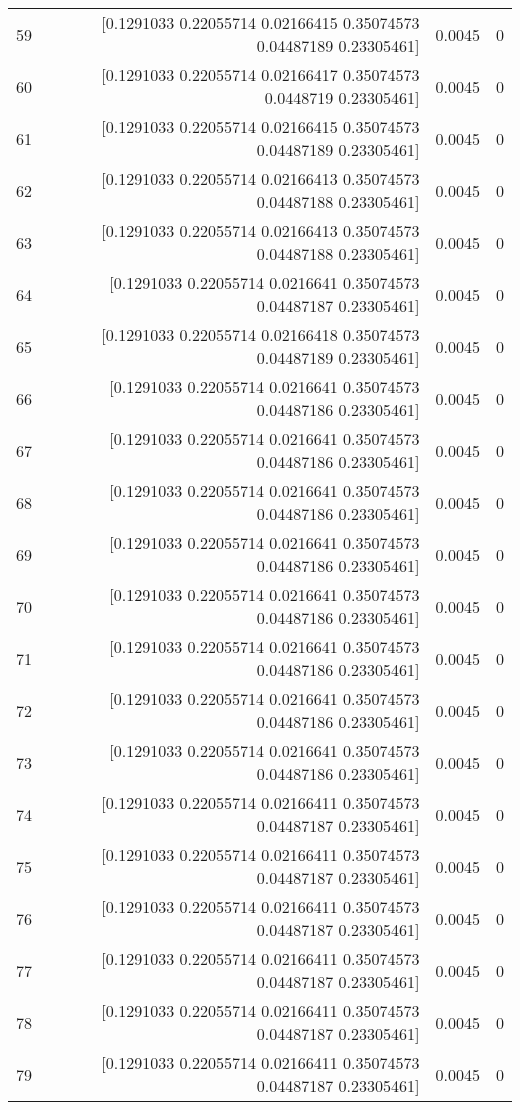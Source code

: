 \begin{longtable}{lrrr}
59 & [0.1291033  0.22055714 0.02166415 0.35074573 0.04487189 0.23305461] & 0.0045 & 0 \\
60 & [0.1291033  0.22055714 0.02166417 0.35074573 0.0448719  0.23305461] & 0.0045 & 0 \\
61 & [0.1291033  0.22055714 0.02166415 0.35074573 0.04487189 0.23305461] & 0.0045 & 0 \\
62 & [0.1291033  0.22055714 0.02166413 0.35074573 0.04487188 0.23305461] & 0.0045 & 0 \\
63 & [0.1291033  0.22055714 0.02166413 0.35074573 0.04487188 0.23305461] & 0.0045 & 0 \\
64 & [0.1291033  0.22055714 0.0216641  0.35074573 0.04487187 0.23305461] & 0.0045 & 0 \\
65 & [0.1291033  0.22055714 0.02166418 0.35074573 0.04487189 0.23305461] & 0.0045 & 0 \\
66 & [0.1291033  0.22055714 0.0216641  0.35074573 0.04487186 0.23305461] & 0.0045 & 0 \\
67 & [0.1291033  0.22055714 0.0216641  0.35074573 0.04487186 0.23305461] & 0.0045 & 0 \\
68 & [0.1291033  0.22055714 0.0216641  0.35074573 0.04487186 0.23305461] & 0.0045 & 0 \\
69 & [0.1291033  0.22055714 0.0216641  0.35074573 0.04487186 0.23305461] & 0.0045 & 0 \\
70 & [0.1291033  0.22055714 0.0216641  0.35074573 0.04487186 0.23305461] & 0.0045 & 0 \\
71 & [0.1291033  0.22055714 0.0216641  0.35074573 0.04487186 0.23305461] & 0.0045 & 0 \\
72 & [0.1291033  0.22055714 0.0216641  0.35074573 0.04487186 0.23305461] & 0.0045 & 0 \\
73 & [0.1291033  0.22055714 0.0216641  0.35074573 0.04487186 0.23305461] & 0.0045 & 0 \\
74 & [0.1291033  0.22055714 0.02166411 0.35074573 0.04487187 0.23305461] & 0.0045 & 0 \\
75 & [0.1291033  0.22055714 0.02166411 0.35074573 0.04487187 0.23305461] & 0.0045 & 0 \\
76 & [0.1291033  0.22055714 0.02166411 0.35074573 0.04487187 0.23305461] & 0.0045 & 0 \\
77 & [0.1291033  0.22055714 0.02166411 0.35074573 0.04487187 0.23305461] & 0.0045 & 0 \\
78 & [0.1291033  0.22055714 0.02166411 0.35074573 0.04487187 0.23305461] & 0.0045 & 0 \\
79 & [0.1291033  0.22055714 0.02166411 0.35074573 0.04487187 0.23305461] & 0.0045 & 0 \\

\end{longtable}
